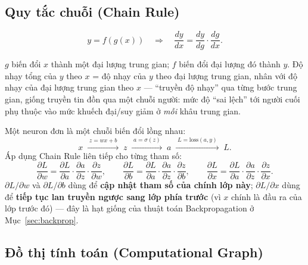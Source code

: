 \documentclass[12pt,a4paper]{report}
\begin{document}
\subsection{Quy tắc chuỗi (Chain Rule)}
\label{sec:chainrule}

$$y = f(g(x)) \quad\Longrightarrow\quad \frac{dy}{dx} = \frac{dy}{dg}\cdot\frac{dg}{dx}.$$

\par\noindent 
$g$ biến đổi $x$ thành một đại lượng trung gian; $f$ biến đổi đại lượng đó
thành $y$. Độ nhạy tổng của $y$ theo $x$ = độ nhạy của $y$ theo đại lượng
trung gian, nhân với độ nhạy của đại lượng trung gian theo $x$ --- ``truyền
độ nhạy'' qua từng bước trung gian, giống truyền tin đồn qua một chuỗi
người: mức độ ``sai lệch'' tới người cuối phụ thuộc vào mức khuếch đại/suy
giảm ở \emph{mỗi} khâu trung gian.
\par

Một neuron đơn là một chuỗi biến đổi lồng nhau:
$$x \;\xrightarrow{\;z=wx+b\;}\; z \;\xrightarrow{\;a=\sigma(z)\;}\; a \;\xrightarrow{\;L=\mathrm{loss}(a,y)\;}\; L.$$
Áp dụng Chain Rule liên tiếp cho từng tham số:
$$\frac{\partial L}{\partial w} = \frac{\partial L}{\partial a}\cdot\frac{\partial a}{\partial z}\cdot\frac{\partial z}{\partial w}, \qquad
\frac{\partial L}{\partial b} = \frac{\partial L}{\partial a}\cdot\frac{\partial a}{\partial z}\cdot\frac{\partial z}{\partial b}, \qquad
\frac{\partial L}{\partial x} = \frac{\partial L}{\partial a}\cdot\frac{\partial a}{\partial z}\cdot\frac{\partial z}{\partial x}.$$
$\partial L/\partial w$ và $\partial L/\partial b$ dùng để \textbf{cập nhật
tham số của chính lớp này}; $\partial L/\partial x$ dùng để \textbf{tiếp
tục lan truyền ngược sang lớp phía trước} (vì $x$ chính là đầu ra của lớp
trước đó) --- đây là hạt giống của thuật toán Backpropagation ở
Mục~\ref{sec:backprop}.

\subsection{Đồ thị tính toán (Computational Graph)}
\label{sec:compgraph}
\end{document}
